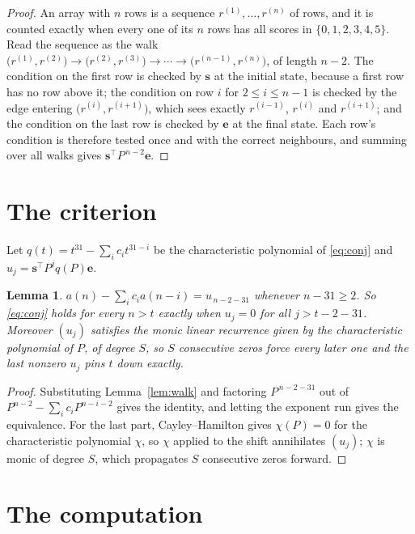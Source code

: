 \documentclass[11pt,a4paper]{article}
\theoremstyle{plain}
\newtheorem{lemma}[theorem]{Lemma}
\theoremstyle{definition}
\begin{document}
\begin{proof}
An array with $n$ rows is a sequence $r^{(1)},\dots,r^{(n)}$ of rows, and it is counted
exactly when every one of its $n$ rows has all scores in $\{0,1,2,3,4,5\}$. Read the sequence as the
walk $\bigl(r^{(1)},r^{(2)}\bigr)\to\bigl(r^{(2)},r^{(3)}\bigr)\to\cdots\to
\bigl(r^{(n-1)},r^{(n)}\bigr)$, of length $n-2$. The condition on the first row is
checked by $\mathbf{s}$ at the initial state, because a first row has no row above it; the
condition on row $i$ for $2\le i\le n-1$ is checked by the edge entering
$\bigl(r^{(i)},r^{(i+1)}\bigr)$, which sees exactly $r^{(i-1)}$, $r^{(i)}$ and
$r^{(i+1)}$; and the condition on the last row is checked by $\mathbf{e}$ at the final
state. Each row's condition is therefore tested once and with the correct neighbours, and
summing over all walks gives $\mathbf{s}^{\!\top}P^{\,n-2}\mathbf{e}$.
\end{proof}

\section{The criterion}

Let $q(t)=t^{31}-\sum_i c_i t^{31-i}$ be the characteristic polynomial of
\eqref{eq:conj} and $u_j=\mathbf{s}^{\!\top}P^{j}q(P)\mathbf{e}$.

\begin{lemma}\label{lem:crit}
$a(n)-\sum_i c_i a(n-i)=u_{\,n-2-31}$ whenever $n-31\ge2$. So \eqref{eq:conj}
holds for every $n>t$ exactly when $u_j=0$ for all $j>t-2-31$. Moreover $(u_j)$
satisfies the monic linear recurrence given by the characteristic polynomial of $P$, of
degree $S$, so $S$ consecutive zeros force every later one and the last nonzero $u_j$ pins
$t$ down exactly.
\end{lemma}

\begin{proof}
Substituting Lemma~\ref{lem:walk} and factoring $P^{\,n-2-31}$ out of
$P^{n-2}-\sum_i c_i P^{n-i-2}$ gives the identity, and letting the exponent run gives the
equivalence. For the last part, Cayley--Hamilton gives $\chi(P)=0$ for the characteristic
polynomial $\chi$, so $\chi$ applied to the shift annihilates $(u_j)$; $\chi$ is monic of
degree $S$, which propagates $S$ consecutive zeros forward.
\end{proof}

\section{The computation}
\end{document}
